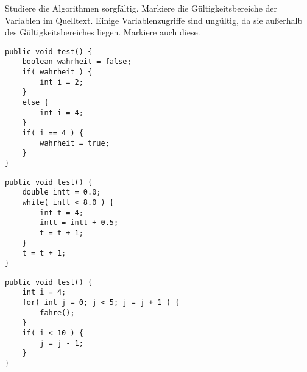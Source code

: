 \documentclass[10pt, a4paper, ngerman]{arbeitsblatt}
\begin{document}
\begin{aufgabe}[subtitle=Gültigkeitsbereiche]
Studiere die Algorithmen sorgfältig. Markiere die Gültigkeitsbereiche der
Variablen im Quelltext. Einige Variablenzugriffe sind ungültig, da sie
außerhalb des Gültigkeitsbereiches liegen. Markiere auch diese.

\begin{verbatim}
public void test() {
	boolean wahrheit = false;
	if( wahrheit ) {
		int i = 2;
	}
	else {
		int i = 4;
	}
	if( i == 4 ) {
		wahrheit = true;
	}
}
\end{verbatim}

\begin{verbatim}
public void test() {
	double intt = 0.0;
	while( intt < 8.0 ) {
		int t = 4;
		intt = intt + 0.5;
		t = t + 1;
	}
	t = t + 1;
}
\end{verbatim}

\begin{verbatim}
public void test() {
	int i = 4;
	for( int j = 0; j < 5; j = j + 1 ) {
		fahre();
	}
	if( i < 10 ) {
		j = j - 1;
	}
}
\end{verbatim}
\end{aufgabe}
\end{document}
